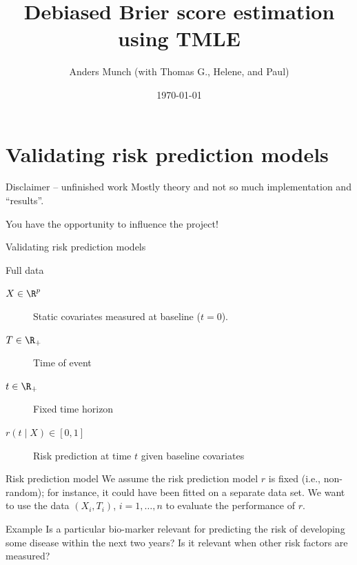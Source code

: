 \documentclass[handout]{beamer}\usepackage{listings}
\author{Anders Munch (with Thomas G., Helene, and Paul)}
\date{\today}
\title{Debiased Brier score estimation using TMLE}
\begin{document}
\maketitle
\section{Validating risk prediction models}
\label{sec:orgac65f51}
\begin{frame}[label={sec:orgc76fc5a}]{Disclaimer -- unfinished work}
Mostly theory and not so much implementation and ``results''.

\vfill \pause

You have the opportunity to influence the project!
\end{frame}

\begin{frame}[label={sec:orgc6ae93a}]{Validating risk prediction models}
\begin{block}{Full data}
\begin{description}
\item[{\(X \in \R^p\)}] Static covariates measured at baseline (\(t=0\)).

\item[{\(T \in \R_+\)}] Time of event

\item[{\(t \in \R_+\)}] Fixed time horizon

\item[{\(r(t \mid X) \in [0,1]\)}] Risk prediction at time \(t\) given baseline covariates
\end{description}

\pause     
\end{block}
\begin{block}{Risk prediction model}
We assume the risk prediction model \(r\) is fixed (i.e., non-random); for instance, it could have
been fitted on a separate data set. We want to use the data \((X_i, T_i)\), \(i=1,\dots,n\) to
evaluate the performance of \(r\). \pause
\end{block}
\begin{block}{Example}
Is a particular bio-marker relevant for predicting the risk of developing some disease within
the next two years? Is it relevant when other risk factors are measured?
\end{block}
\end{frame}
\end{document}
